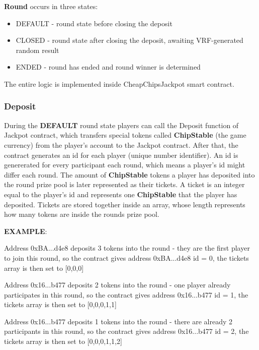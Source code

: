 \documentclass[12pt]{article}
\begin{document}
\hfill

\textbf{Round} occurs in three states:
\begin{itemize}
    \item DEFAULT - round state before closing the deposit
    \item CLOSED - round state after closing the deposit, awaiting VRF-generated random result
    \item ENDED - round has ended and round winner is determined
\end{itemize}

\hfill

The entire logic is implemented inside CheapChipsJackpot smart contract.

\subsubsection{Deposit}

During the \textbf{DEFAULT} round state players can call the Deposit function of Jackpot contract, which transfers special tokens called \textbf{ChipStable} (the game currency) from the player's account to the Jackpot contract. After that, the contract generates an id for each player (unique number identifier). An id is genererated for every participant each round, which means a player's id might differ each round. The amount of \textbf{ChipStable} tokens a player has deposited into the round prize pool is later represented as their tickets. A ticket is an integer equal to the player's id and represents one \textbf{ChipStable} that the player has deposited. Tickets are stored together inside an array, whose length represents how many tokens are inside the rounds prize pool.  

\newpage

\textbf{EXAMPLE}:

Address 0xBA...d4e8 deposits 3 tokens into the round - they are the first player to join this round, so the contract gives address 0xBA...d4e8 id = 0, the tickets array is then set to [0,0,0]

Address 0x16...b477 deposits 2 tokens into the round - one player already participates in this round, so the contract gives address 0x16...b477 id = 1, the tickets array is then set to [0,0,0,1,1]

Address 0x16...b477 deposits 1 tokens into the round - there are already 2 participants in this round, so the contract gives address 0x16...b477 id = 2, the tickets array is then set to [0,0,0,1,1,2]
\end{document}

